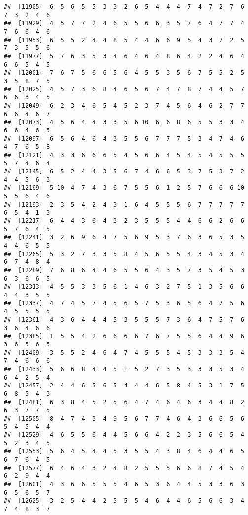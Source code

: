 \documentclass[
]{book}
\begin{document}
\begin{verbatim}
##  [11905]  6  5  6  5  5  3  3  2  6  5  4  4  4  7  4  7  2  7  6  7  3  2  4  6
##  [11929]  4  5  7  7  2  4  6  5  5  6  6  3  5  7  6  4  7  7  4  7  6  6  4  6
##  [11953]  6  5  5  2  4  4  8  5  4  4  6  6  9  5  4  3  7  2  5  7  3  5  5  6
##  [11977]  5  7  6  3  5  3  4  6  4  6  4  8  6  4  2  2  4  6  4  6  6  5  4  5
##  [12001]  7  6  7  5  6  6  5  6  4  5  5  3  5  6  7  5  5  2  5  3  5  8  7  5
##  [12025]  4  5  7  3  6  8  4  6  5  6  7  4  7  8  7  4  4  5  7  6  6  3  4  5
##  [12049]  6  2  3  4  6  5  4  5  2  3  7  4  5  6  4  6  2  7  7  6  6  4  6  7
##  [12073]  4  5  6  4  4  3  3  5  6 10  6  6  8  6  5  5  3  3  4  6  6  4  6  5
##  [12097]  6  5  6  4  6  4  3  5  5  6  7  7  7  5  3  4  7  4  6  4  7  6  5  8
##  [12121]  4  3  3  6  6  6  5  4  5  6  6  4  5  4  5  4  5  5  5  5  7  4  6  4
##  [12145]  6  5  2  4  4  3  5  6  7  4  6  6  5  3  7  5  3  7  2  4  4  5  6  3
##  [12169]  5 10  4  7  4  3  6  7  5  5  6  1  2  5  7  6  6  6 10  5  5  6  4  6
##  [12193]  2  3  5  4  2  4  3  1  6  4  5  5  5  6  7  7  7  7  7  6  5  4  1  3
##  [12217]  6  4  4  3  6  4  3  2  3  5  5  5  4  4  6  6  2  6  6  5  7  6  4  5
##  [12241]  3  2  6  9  6  4  7  5  6  9  5  3  7  6  3  6  5  3  5  4  4  6  5  5
##  [12265]  5  3  2  7  3  3  5  8  4  5  6  5  5  4  3  4  5  3  4  6  7  4  8  4
##  [12289]  7  6  8  6  4  4  6  5  5  6  4  3  5  7  3  5  4  5  3  6  3  6  6  5
##  [12313]  4  5  5  3  3  5  6  1  4  6  3  2  7  5  1  3  5  6  6  4  4  3  5  5
##  [12337]  4  7  4  5  7  4  5  6  5  7  5  3  6  5  6  4  7  5  6  4  5  5  5  5
##  [12361]  4  3  6  4  4  4  5  3  5  5  5  7  3  6  4  7  5  7  6  3  6  4  6  6
##  [12385]  1  5  5  4  2  6  6  6  6  7  6  7  5  5  6  4  4  9  6  3  6  5  6  5
##  [12409]  3  5  5  2  4  6  4  7  4  5  5  5  4  5  3  3  3  5  4  7  4  6  6  6
##  [12433]  5  6  6  8  4  4  5  1  5  2  7  3  5  3  3  3  5  3  4  6  4  2  5  4
##  [12457]  2  4  4  6  5  6  5  4  4  4  6  5  8  4  5  3  1  7  5  6  8  5  4  3
##  [12481]  6  3  8  4  5  2  5  6  4  7  4  6  4  6  3  4  4  8  2  6  3  7  7  5
##  [12505]  8  4  7  4  3  4  9  5  6  7  7  4  6  4  3  6  6  5  6  5  4  5  4  4
##  [12529]  4  6  5  5  6  4  4  5  6  6  4  2  2  3  5  6  6  5  4  5  2  3  4  5
##  [12553]  5  6  4  5  4  4  5  3  5  5  4  3  8  4  6  4  4  6  5  6  7  6  4  5
##  [12577]  6  4  6  4  3  2  4  8  2  5  5  5  6  6  8  7  4  5  4  6  2  9  4  4
##  [12601]  4  3  6  6  5  5  5  4  6  5  3  6  4  4  5  3  3  6  3  6  5  6  5  7
##  [12625]  3  2  5  4  4  2  5  5  5  4  6  4  4  6  5  6  6  3  4  7  4  8  3  7

\end{verbatim}
\end{document}
